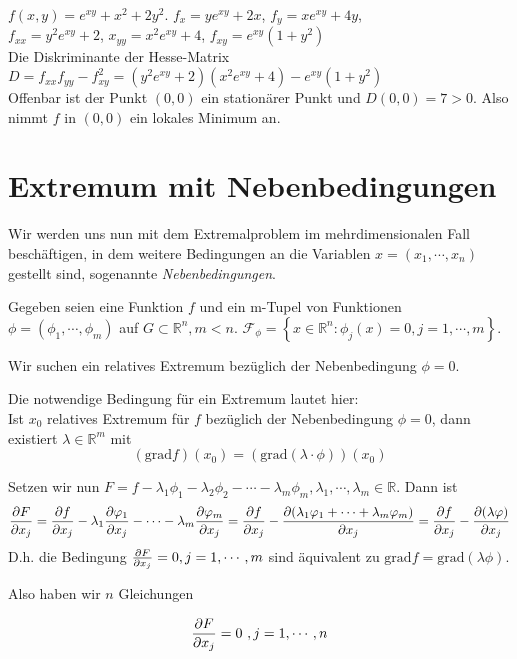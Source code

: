 $f(x,y) = e^{xy} + x^2 + 2y^2$. $f_x = ye^{xy} + 2x$, $f_y = xe^{xy} + 4y$, \\
$f_{xx} = y^2e^{xy} + 2$, $x_{yy} = x^2e^{xy} + 4$, $f_{xy} = e^{xy}(1+y^2)$ \\
Die Diskriminante der Hesse-Matrix $D = f_{xx}f_{yy} - f_{xy}^2 = (y^2e^{xy} + 2)(x^2e^{xy} + 4) - e^{xy}(1+y^2)$ \\
Offenbar ist der Punkt $(0,0)$ ein stationärer Punkt und $D(0,0) = 7 > 0$. Also nimmt $f$ in $(0,0)$ ein lokales
Minimum an.


\section{Extremum mit Nebenbedingungen}

Wir werden uns nun mit dem Extremalproblem im mehrdimensionalen Fall beschäftigen, in dem weitere Bedingungen an die Variablen
$x = (x_1, \cdots, x_n)$ gestellt sind, sogenannte {\it Nebenbedingungen}.

Gegeben seien eine Funktion $f$ und ein m-Tupel von Funktionen $\phi = (\phi_1, \cdots, \phi_m)$ auf $G\subset\mathbb{R}^n, m<n$.
$\mathcal{F}_\phi = \left\{x\in\mathbb{R}^n : \phi_j(x) = 0, j=1,\cdots,m \right\}$.

Wir suchen ein relatives Extremum bezüglich der Nebenbedingung $\phi = 0$.

Die notwendige Bedingung für ein Extremum lautet hier:\\
Ist $x_0$ relatives Extremum für $f$ bezüglich der Nebenbedingung $\phi = 0$, dann existiert $\lambda\in\mathbb{R}^m$ mit
\[ (\mathrm{grad}f)(x_0) = (\mathrm{grad}(\lambda\cdot\phi))(x_0) \]

Setzen wir nun $F = f - \lambda_1\phi_1 - \lambda_2\phi_2 - \cdots - \lambda_m\phi_m, \lambda_1,\cdots,\lambda_m\in\mathbb{R}$.
Dann ist 
\[ \frac{\partial F}{\partial x_j} = \frac{\partial f}{\partial x_j} - \lambda_1\frac{\partial \varphi_1}{\partial x_j} - \cdots - \lambda_m\frac{\partial \varphi_m}{\partial x_j}
    = \frac{\partial f}{\partial x_j} - \frac{\partial (\lambda_1\varphi_1 + \cdots + \lambda_m\varphi_m)}{\partial x_j} = \frac{\partial f}{\partial x_j} - \frac{\partial (\lambda\varphi)}{\partial x_j} \]
D.h. die Bedingung $\frac{\partial F}{\partial x_j} = 0, j = 1,\cdots,m$ sind äquivalent zu $\mathrm{grad}f = \mathrm{grad}(\lambda\phi)$.

Also haben wir $n$ Gleichungen

\begin{equation}
    \frac{\partial F}{\partial x_j} = 0 \,\, , j = 1, \cdots, n
    \label{eq:nb1}
\end{equation}

